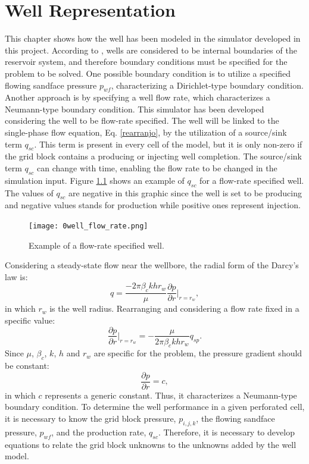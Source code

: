 \chapter{Well Representation}
\label{wellRepresentaion}
This chapter shows how the well has been modeled in the simulator developed in this project. According to \cite{Ertekin2001}, wells are considered to be internal boundaries of the reservoir system, and therefore boundary conditions must be specified for the problem to be solved. One possible boundary condition is to utilize a specified flowing sandface pressure $p_{wf}$, characterizing a Dirichlet-type boundary condition. Another approach is by specifying a well flow rate, which characterizes a Neumann-type boundary condition. This simulator has been developed considering the well to be flow-rate specified. The well will be linked to the single-phase flow equation, Eq. \ref{rearranjo}, by the utilization of a source/sink term $q_{sc}$. This term is present in every cell of the model, but it is only non-zero if the grid block contains a producing or injecting well completion. The source/sink term $q_{sc}$ can change with time, enabling the flow rate to be changed in the simulation input. Figure \ref{fig:flowrate} shows an example of $q_{sc}$ for a flow-rate specified well. The values of $q_{sc}$ are negative in this graphic since the well is set to be producing and negative values stands for production while positive ones represent injection.
 \begin{figure}[h]
	\centering
	\texttt{[image: 0well\_flow\_rate.png]}\\
	\caption{Example of a flow-rate specified well.}
	\label{fig:flowrate}
\end{figure}
%
Considering a steady-state flow near the wellbore, the radial form of the Darcy's law is:
\begin{equation}
\label{wm2}
q=\frac{-2\pi \beta_c k h r_w}{\mu}\frac{\partial p}{\partial r}\Bigg|_{r=r_w},
\end{equation}
in which $r_w$ is the well radius. Rearranging and considering a flow rate fixed in a specific value:
\begin{equation}
\label{wm3}
\frac{\partial p}{\partial r}\Bigg|_{r=r_w}=-\frac{\mu}{2\pi\beta_c khr_w}q_{sp}.
\end{equation}
Since $\mu$, $\beta_c$, $k$, $h$ and $r_w$ are specific for the problem, the pressure gradient should be constant:
\begin{equation}
\label{wm1}
\frac{\partial p}{\partial r}=c,
\end{equation}
in which $c$ represents a generic constant. Thus, it characterizes a Neumann-type boundary condition. To determine the well performance in a given perforated cell, it is necessary to know the grid block pressure, $p_{i,j,k}$, the flowing sandface pressure, $p_{wf}$, and the production rate, $q_{sc}$. Therefore, it is necessary to develop equations to relate the grid block unknowns to the unknowns added by the well model.
